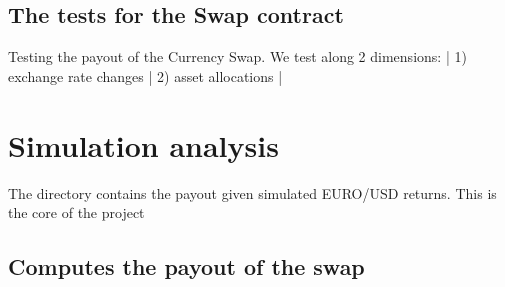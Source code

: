 \documentclass[a4paper,11pt,english]{sphinxmanual}
\begin{document}
\section{The tests for the Swap contract}
\label{\detokenize{financial_contracts:module-src.financial_contracts.test_swap_contract}}\label{\detokenize{financial_contracts:the-tests-for-the-swap-contract}}
\sphinxAtStartPar
Testing the payout of the Currency Swap.
We test along 2 dimensions: |
1) exchange rate changes |
2) asset allocations |


\chapter{Simulation analysis}
\label{\detokenize{simulation_analysis:simulation-analysis}}\label{\detokenize{simulation_analysis:id1}}\label{\detokenize{simulation_analysis::doc}}
\sphinxAtStartPar
The directory  contains the payout given simulated EURO/USD returns. This is the core of the project


\section{Computes the payout of the swap}
\label{\detokenize{simulation_analysis:module-src.simulation_analysis.task_swap_payout}}\label{\detokenize{simulation_analysis:computes-the-payout-of-the-swap}}
\end{document}
